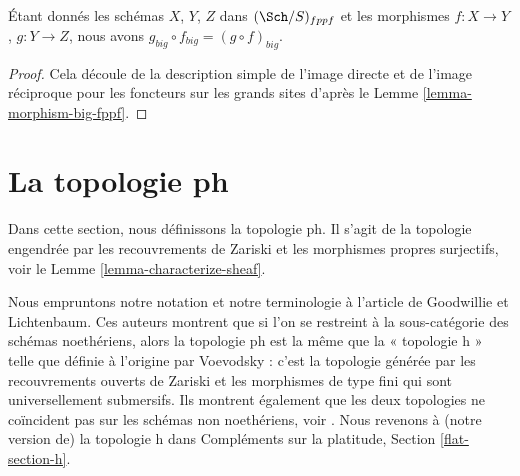 \begin{lemma}
\label{lemma-composition-fppf}
Étant donnés les schémas $X$, $Y$, $Z$ dans $(\Sch/S)_{fppf}$ et les morphismes $f : X \to Y$, $g : Y \to Z$, nous avons $g_{big} \circ f_{big} = (g \circ f)_{big}$.
\end{lemma}

\begin{proof}
Cela découle de la description simple de l'image directe et de l'image réciproque pour les foncteurs sur les grands sites d'après le Lemme \ref{lemma-morphism-big-fppf}.
\end{proof}



















































\section{La topologie ph}
\label{section-ph}

\noindent
Dans cette section, nous définissons la topologie ph. Il s'agit de la topologie engendrée par les recouvrements de Zariski et les morphismes propres surjectifs, voir le Lemme \ref{lemma-characterize-sheaf}.

\medskip\noindent
Nous empruntons notre notation et notre terminologie à l'article \cite{ph} de Goodwillie et Lichtenbaum. Ces auteurs montrent que si l'on se restreint à la sous-catégorie des schémas noethériens, alors la topologie ph est la même que la « topologie h » telle que définie à l'origine par Voevodsky : c'est la topologie générée par les recouvrements ouverts de Zariski et les morphismes de type fini qui sont universellement submersifs. Ils montrent également que les deux topologies ne coïncident pas sur les schémas non noethériens, voir \cite[Exemple 4.5]{ph}. Nous revenons à (notre version de) la topologie h dans Compléments sur la platitude, Section \ref{flat-section-h}.

